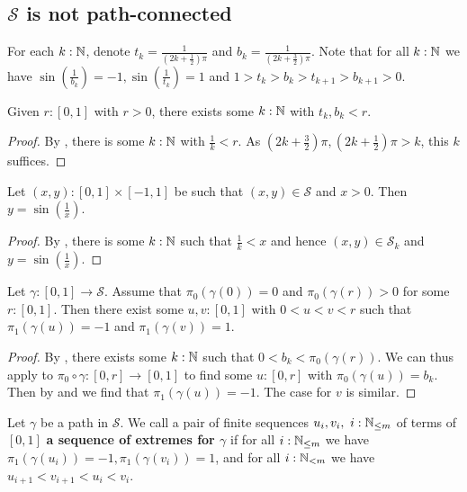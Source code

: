 \subsection{$\mathcal S$ is not path-connected}\label{curveNotPathConnected}
\begin{remark}\label{topbottomSeq}
  For each $k:\mathbb{N}$, denote $t_k = \frac1{(2k+\frac12) \pi}$ and $b_k = \frac1{(2k+\frac32) \pi}$. 
  Note that for all $k:\mathbb{N}$ we have $\sin(\frac1{b_k})=-1, \sin(\frac1{t_k})=1$ and
  $1>t_k>b_k>t_{k+1}>b_{k+1}>0$. 
\end{remark}
\begin{lemma}\label{cofinaltbseq}
  Given $r:[0,1]$ with $r>0$, there exists some $k:\mathbb{N}$ with $t_k,b_k<r$.  
\end{lemma}
\begin{proof}
  By , there is some $k:\mathbb{N}$ with $\frac1k<r$. As $(2k+\frac32)\pi,(2k+\frac12)\pi>k$, this $k$ suffices.
\end{proof}
\begin{lemma}\label{NonZeroOnGraph}
  Let $(x,y):[0,1]\times[-1,1]$ be such that $(x,y)\in\mathcal S$ and $x>0$.
  Then $y = \sin(\frac1x)$.
\end{lemma}
\begin{proof}
  By , there is some $k:\mathbb{N}$ such that $\frac1k<x$ and hence $(x,y)\in \mathcal S_k$ and $y = \sin(\frac1x)$. 
\end{proof}

\begin{lemma}\label{SineWillHitTopBot}
  Let $\gamma:[0,1] \to \mathcal S$. 
  Assume that $\pi_0(\gamma(0)) = 0$ and $\pi_0(\gamma(r))>0$ for some $r:[0,1]$.
  Then there exist some $u,v:[0,1]$ with $0<u<v<r$ such that $\pi_1(\gamma(u)) = -1$ and $\pi_1(\gamma(v)) = 1$.
\end{lemma}
\begin{proof}
  By , there exists some $k:\mathbb{N}$ such that $0 < b_k<\pi_0(\gamma(r))$. 
  We can thus apply  to $\pi_0\circ \gamma : [0,r] \to [0,1]$ to find some $u:[0,r]$ with $\pi_0(\gamma(u)) = b_k$. Then by  and  we find that $\pi_1(\gamma(u)) = -1$.
  The case for $v$ is similar. 
\end{proof}
\begin{remark}
  Let $\gamma$ be a path in $\mathcal S$. We call a pair of finite sequences $u_i,v_i,~i:\mathbb{N}_{\leq m}$ of terms of $[0,1]$ \textbf{a sequence of extremes for $\gamma$} if for all $i:\mathbb{N}_{\leq m}$ we have $\pi_1(\gamma(u_i)) = -1, \pi_1(\gamma(v_i)) = 1$, and for all $i:\mathbb{N}_{<m}$ we have $u_{i+1}<v_{i+1}<u_i<v_i$.
\end{remark}

